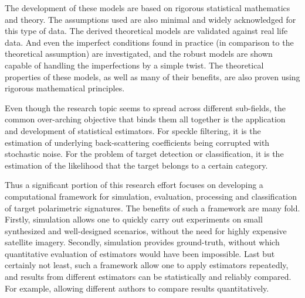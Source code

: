  The
                development of these models are based on
                rigorous statistical mathematics and theory. 
The
                assumptions used are also minimal and widely
                acknowledged for this type of data.
The
                derived theoretical models are validated against
                real life data.
And
                even the imperfect conditions found in practice (in
                comparison to the theoretical assumption) are
                investigated, and the robust models are shown capable of
                handling the imperfections by a simple twist.
The
                theoretical properties of these models, as well as many
                of their benefits, are also proven using rigorous
                mathematical principles.

Even though the research topic seems to spread across different sub-fields, the common over-arching objective that binds them all together is the application and development of statistical estimators.
For speckle filtering, it is the estimation of underlying back-scattering coefficients being corrupted with stochastic noise.
For the problem of target detection or classification,
  it is the estimation of the likelihood that the target belongs to a certain category.

Thus a significant portion of this research effort focuses on developing a computational framework for simulation, evaluation, processing and classification of target polarimetric signatures.
The benefits of such a framework are many fold.
Firstly, simulation allows one to quickly carry out experiments on small synthesized and well-designed scenarios, without the need for highly expensive satellite imagery.
Secondly, simulation provides ground-truth, without which quantitative evaluation of estimators would have been impossible.
Last but certainly not least, such a framework allow one to apply estimators repeatedly, and results from different estimators can be statistically and reliably compared. For example, allowing different authors to compare results quantitatively.

